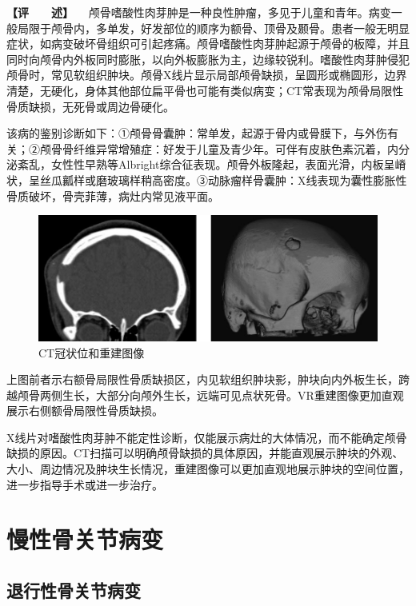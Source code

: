 \textbf{【评　　述】}
　颅骨嗜酸性肉芽肿是一种良性肿瘤，多见于儿童和青年。病变一般局限于颅骨内，多单发，好发部位的顺序为额骨、顶骨及颞骨。患者一般无明显症状，如病变破坏骨组织可引起疼痛。颅骨嗜酸性肉芽肿起源于颅骨的板障，并且同时向颅骨内外板同时膨胀，以向外板膨胀为主，边缘较锐利。嗜酸性肉芽肿侵犯颅骨时，常见软组织肿块。颅骨X线片显示局部颅骨缺损，呈圆形或椭圆形，边界清楚，无硬化，身体其他部位扁平骨也可能有类似病变；CT常表现为颅骨局限性骨质缺损，无死骨或周边骨硬化。

该病的鉴别诊断如下：①颅骨骨囊肿：常单发，起源于骨内或骨膜下，与外伤有关；②颅骨骨纤维异常增殖症：好发于儿童及青少年。可伴有皮肤色素沉着，内分泌紊乱，女性性早熟等Albright综合征表现。颅骨外板隆起，表面光滑，内板呈嵴状，呈丝瓜瓤样或磨玻璃样稍高密度。③动脉瘤样骨囊肿：X线表现为囊性膨胀性骨质破坏，骨壳菲薄，病灶内常见液平面。

\begin{figure}[!htbp]
 \centering
 \includegraphics{./images/Image00114.jpg}
 \captionsetup{justification=centering}
 \caption{CT冠状位和重建图像}
 \label{fig2-7-29}
  \end{figure} 

上图前者示右额骨局限性骨质缺损区，内见软组织肿块影，肿块向内外板生长，跨越颅骨两侧生长，大部分向颅外生长，远端可见点状死骨。VR重建图像更加直观展示右侧额骨局限性骨质缺损。

X线片对嗜酸性肉芽肿不能定性诊断，仅能展示病灶的大体情况，而不能确定颅骨缺损的原因。CT扫描可以明确颅骨缺损的具体原因，并能直观展示肿块的外观、大小、周边情况及肿块生长情况，重建图像可以更加直观地展示肿块的空间位置，进一步指导手术或进一步治疗。

\section{慢性骨关节病变}

\subsection{退行性骨关节病变}

